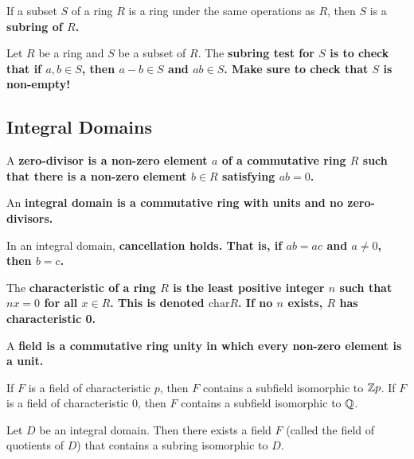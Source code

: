 \documentclass{hmwk}
\begin{document}
\begin{defn}
If a subset $S$ of a ring $R$ is a ring under the same operations as $R$, then $S$ is a \bf{subring} of $R$.
\end{defn}

\begin{prop}
Let $R$ be a ring and $S$ be a subset of $R$. The \bf{subring test} for $S$ is to check that if $a, b \in S$, then $a - b \in S$ and $ab \in S$. Make sure to check that $S$ is non-empty!
\end{prop}

\subsection{Integral Domains}

\begin{defn}
A \bf{zero-divisor} is a non-zero element $a$ of a commutative ring $R$ such that there is a non-zero element $b \in R$ satisfying $ab = 0$.
\end{defn}

\begin{defn}
An \bf{integral domain} is a commutative ring with units and no zero-divisors.
\end{defn}

\begin{prop}
In an integral domain, \bf{cancellation} holds. That is, if $ab = ac$ and $a \neq 0$, then $b = c$.
\end{prop}

\begin{defn}
The \bf{characteristic} of a ring $R$ is the least positive integer $n$ such that $nx = 0$ for all $x \in R$. This is denoted $\text{char} R$. If no $n$ exists, $R$ has characteristic 0. 
\end{defn}

\begin{defn}
A \bf{field} is a commutative ring unity in which every non-zero element is a unit. 
\end{defn}

\begin{prop}
If $F$ is a field of characteristic $p$, then $F$ contains a subfield isomorphic to $\mathbb{Z} p$. If $F$ is a field of characteristic 0, then $F$ contains a subfield isomorphic to $\mathbb{Q}$.
\end{prop}

\begin{prop}
Let $D$ be an integral domain. Then there exists a field $F$ (called the field of quotients of $D$) that contains a subring isomorphic to $D$.
\end{prop}
\end{document}
